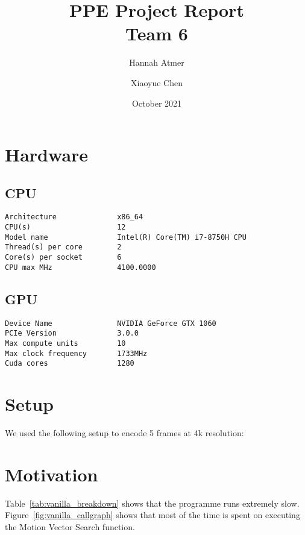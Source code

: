 \documentclass[a4paper]{article}
\title{PPE Project Report\\Team 6}
\author{Hannah Atmer \and Xiaoyue Chen}
\date{October 2021}
\begin{document}
\maketitle
\tableofcontents


\section{Hardware}
\subsection{CPU}
\begin{verbatim}
Architecture              x86_64
CPU(s)                    12
Model name                Intel(R) Core(TM) i7-8750H CPU
Thread(s) per core        2
Core(s) per socket        6
CPU max MHz               4100.0000
\end{verbatim}

\subsection{GPU}
\begin{verbatim}
Device Name               NVIDIA GeForce GTX 1060
PCIe Version              3.0.0
Max compute units         10
Max clock frequency       1733MHz
Cuda cores                1280
\end{verbatim}

\section{Setup}
We used the following setup to encode 5 frames at 4k resolution:


\section{Motivation}
Table~\ref{tab:vanilla_breakdown} shows that the programme runs
extremely slow. Figure~\ref{fig:vanilla_callgraph} shows that most of
the time is spent on executing the Motion Vector Search function.
\end{document}
